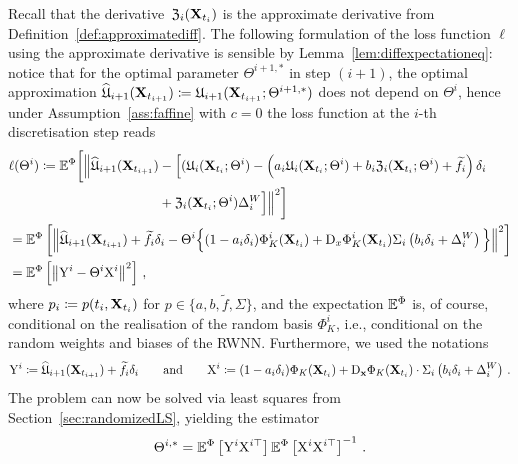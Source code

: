 Recall that the derivative~$\mathfrak{Z}_{i}(\mathbf{X}_{t_i})$ is the approximate derivative from Definition~\ref{def:approximatediff}. The following formulation of the loss function $\ell$ using the approximate derivative is sensible by Lemma~\ref{lem:diffexpectationeq}: notice that for the optimal parameter $\Theta^{i+1, *}$ in step $(i+1)$, the optimal approximation $\widehat {\mathfrak{U}}_{i+1}(\mathbf{X}_{t_{i+1}})\coloneqq\mathfrak{U}_{i+1}(\mathbf{X}_{t_{i+1}}; \Theta^{i+1, *})$ 
does not depend on $\Theta^i$, hence under Assumption~\ref{ass:faffine} with $c=0$ the loss function at the $i$-th discretisation step reads
\begin{align*}
    &\ell(\Theta^i) \defEqual 
    \EE^\Phi\bigg[\Big\| \widehat \Uf_{i+1}(\XX_{t_{i+1}}) - \Big[(\Uf_i(\XX_{t_i};\Theta^i) - \left(a_{i}\Uf_i(\XX_{t_i};\Theta^i) + b_{i}\Zf_{i}(\XX_{t_i}; \Theta^i) + \widetilde{f}_{i}\right)\Deli \\
    & \hspace{4cm}+ \Zf_{i}(\XX_{t_i}; \Theta^i)\DelWi\Big] \Big\|^2\bigg] \\
    &= \EE^\Phi\left[\left\| \widehat \Uf_{i+1}(\XX_{t_{i+1}}) + \widetilde{f}_{i}\Deli - \Theta^i\Big\{(1-a_{i}\Deli)\Phi_K^i(\XX_{t_i}) + \Dx \Phi_K^i(\XX_{t_i}) \Sigma_i \left(b_{i}\Deli  + \DelWi\right)\Big\} \right\|^2\right] \\
    &= \EE^\Phi\left[\left\| \Y^i - \Theta^i \X^i \right\|^2\right]\,,
\end{align*}
where $p_{i} \coloneqq p(t_i, \mathbf{X}_{t_i})$ for $p \in \{a, b, \widetilde{f}, \Sigma\}$, and the expectation $\mathbb{E}^\Phi$ is, of course, conditional on the realisation of the random basis $\Phi_K^i$, i.e., conditional on the random weights and biases of the RWNN. Furthermore, we used the notations
\[
\mathrm{Y}^i \coloneqq \widehat {\mathfrak{U}}_{i+1}(\mathbf{X}_{t_{i+1}}) + \widetilde{f}_{i}\delta_{i}
    \qquad\text{and}\qquad
\mathrm{X}^i \coloneqq 
(1-a_{i}\delta_{i})\Phi_K(\mathbf{X}_{t_i}) + \mathrm{D}_{\boldsymbol{\mathrm{x}}}\Phi_K(\mathbf{X}_{t_i})\cdot \Sigma_i \left(b_{i}\delta_{i}  + \Delta^{W}_{i}\right)\,.
\]
The problem can now be solved via least squares from Section~\ref{sec:randomizedLS}, yielding the estimator
$$
\Theta^{i,*} = \mathbb{E}^\Phi\left[\mathrm{Y}^i\mathrm{X}^{i\top}\right]
\mathbb{E}^\Phi\left[\mathrm{X}^i\mathrm{X}^{i\top}\right]^{-1}\,.
$$
